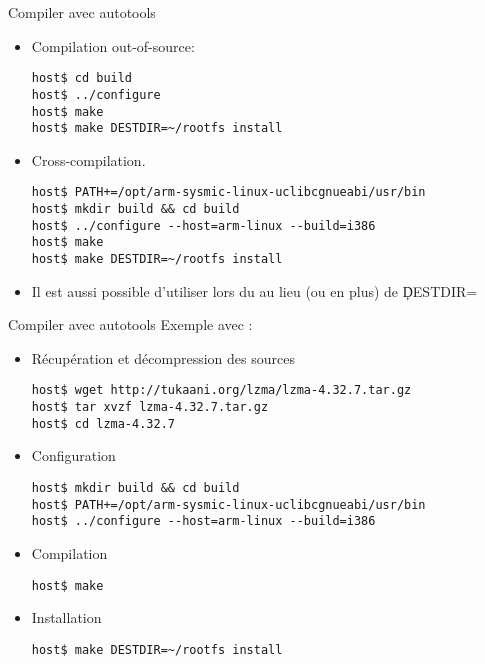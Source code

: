 \begin{frame}[fragile=singleslide]{Compiler avec autotools}
  \begin{itemize}
  \item  Compilation out-of-source:
    \begin{lstlisting}
host$ cd build
host$ ../configure
host$ make
host$ make DESTDIR=~/rootfs install
    \end{lstlisting} %
  \item  Cross-compilation.
    \begin{lstlisting}
host$ PATH+=/opt/arm-sysmic-linux-uclibcgnueabi/usr/bin
host$ mkdir build && cd build
host$ ../configure --host=arm-linux --build=i386
host$ make
host$ make DESTDIR=~/rootfs install
    \end{lstlisting} %
  \item  Il   est  aussi  possible  d'utiliser  lors du
     au lieu (ou en plus) de \c{DESTDIR=}
  \end{itemize}
\end{frame}

\begin{frame}[fragile=singleslide]{Compiler avec autotools}
  Exemple avec :
  \begin{itemize}
  \item Récupération et décompression des sources
\begin{lstlisting}
host$ wget http://tukaani.org/lzma/lzma-4.32.7.tar.gz
host$ tar xvzf lzma-4.32.7.tar.gz
host$ cd lzma-4.32.7
\end{lstlisting} %
  \item Configuration
\begin{lstlisting}
host$ mkdir build && cd build
host$ PATH+=/opt/arm-sysmic-linux-uclibcgnueabi/usr/bin
host$ ../configure --host=arm-linux --build=i386
\end{lstlisting} %
  \item Compilation
\begin{lstlisting}
host$ make
\end{lstlisting} %
  \item Installation
\begin{lstlisting}
host$ make DESTDIR=~/rootfs install
\end{lstlisting} %
  \end{itemize}
\end{frame}

